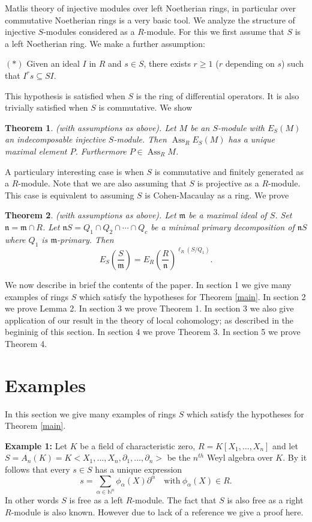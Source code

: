 \documentclass{amsart}
\theoremstyle{plain}
\newtheorem{thm}{Theorem}
\theoremstyle{definition}
\theoremstyle{remark}
\numberwithin{equation}{theorem}
\begin{document}
Matlis theory of injective modules over left Noetherian rings, in particular over commutative Noetherian rings is a
 very basic tool.
We analyze the structure of injective $S$-modules considered as a $R$-module. For this we first assume that $S$ is a left Noetherian ring. 
 We make a further assumption:

$(*)$  Given an ideal $I$ in $R$ and $s \in S$, there exists $r \geq 1$ ($r$ depending on $s$) such that $I^rs \subseteq SI$.

This hypothesis is satisfied when $S$ is the ring of differential operators. It is also trivially satisfied when $S$ is commutative. We show
\begin{thm}\label{ind-I}
(with assumptions as above). Let $M$ be an $S$-module with $E_S(M)$ an indecomposable injective $S$-module. Then
${\operatorname{Ass}}_R E_S(M)$ has a unique maximal element $P$. Furthermore $P \in {\operatorname{Ass}}_R M$.
\end{thm}

A particulary interesting case is when $S$ is commutative and finitely generated as a $R$-module. Note that we are also assuming that $S$ is projective as a $R$-module. This case is equivalent to assuming $S$ is Cohen-Macaulay as a ring. 
We prove
\begin{thm}\label{CM-I}
(with assumptions as above). Let ${\mathfrak{m} }$ be a maximal ideal of $S$. Set ${\mathfrak{n} } = {\mathfrak{m} } \cap R$.
Let ${\mathfrak{n} } S = Q_1\cap Q_2\cap\cdots \cap Q_c$ be a minimal primary decomposition of ${\mathfrak{n} } S$ where $Q_1$ is ${\mathfrak{m} }$-primary.
Then
\[
E_S\left(\frac{S}{\mathfrak{m} }\right) = E_R\left(\frac{R}{\mathfrak{n} }\right)^{\ell_R(S/Q_1)}.
\]
\end{thm}

We now describe in brief the contents of the paper. In section 1 we give many examples  of rings $S$ which satisfy the hypotheses for Theorem \ref{main}. In section 2 we prove Lemma 2. In section 3 we prove Theorem 1. 
In section 3 we also give application of our result in the theory of local cohomology; as described in the begininig of this section.
In section 4 we prove Theorem 3. In section 5 we prove Theorem 4. 
\section{Examples}
In this section we give many examples  of rings $S$ which satisfy the hypotheses for Theorem \ref{main}.

\textbf{Example 1:}  Let $K$ be a field of characteristic zero, $R = K[X_1,\ldots,X_n]$ and  let $S = A_n(K) = K<X_1,\ldots,X_n, \partial_1, \ldots, \partial_n>$  be the $n^{th}$ Weyl algebra over $K$. By \cite[p.\ 3, 1.2]{B}
it follows that every $s \in S$ has a unique expression
\[
s = \sum_{\alpha \in \mathbb{N}^n} \phi_{\alpha}(X){\mathbb{\partial}}^\alpha \quad \text{with}\ \phi_{\alpha}(X) \in R.
\]
In other words $S$ is free as a left $R$-module. The fact that $S$ is also free as a right $R$-module is also known. However due to lack of a reference we give a proof here.
\end{document}
